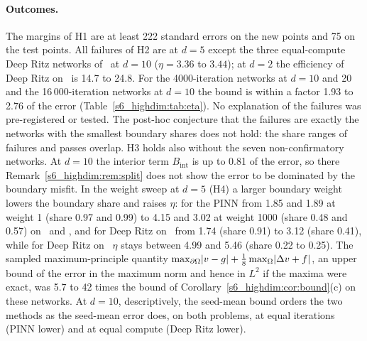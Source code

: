 \paragraph{Outcomes.} The margins of H1 are at least 222 standard errors on the new points and
75 on the test points. All failures of H2 are at $d=5$ except the three equal-compute Deep Ritz
networks of \Ptwo\ at $d=10$ ($\eta=3.36$ to $3.44$); at $d=2$ the efficiency of Deep Ritz on
\Ptwo\ is 14.7 to 24.8. For the 4000-iteration networks at $d=10$ and 20 and the
16\,000-iteration networks at $d=10$ the bound is within a factor 1.93 to 2.76 of the error
(Table~\ref{s6_highdim:tab:eta}).
No explanation of the failures was pre-registered or tested. The post-hoc conjecture that the
failures are exactly the networks with the smallest boundary shares does not hold: the share ranges
of failures and passes overlap.
H3 holds also without the seven non-confirmatory networks. At $d=10$ the interior term
$B_{\mathrm{int}}$ is up to 0.81 of the error, so there Remark~\ref{s6_highdim:rem:split} does
not show the error to be dominated by the boundary misfit.
In the weight sweep at $d=5$ (H4) a larger boundary weight lowers the boundary share and raises
$\eta$: for the PINN from 1.85 and 1.89 at weight 1 (share 0.97 and 0.99) to 4.15 and 3.02 at
weight 1000 (share 0.48 and 0.57) on \Ptwo\ and \Pone, and for Deep Ritz on \Pone\ from 1.74
(share 0.91) to 3.12 (share 0.41), while for Deep Ritz on \Ptwo\ $\eta$ stays between 4.99 and 5.46
(share 0.22 to 0.25). The sampled maximum-principle quantity
$\max_{\partial\Omega}\lvert v-g\rvert+\frac18\max_\Omega\lvert \Delta v+f\rvert$, an upper bound of the error in the maximum
norm and hence in $L^2$ if the maxima were exact, was 5.7 to 42 times the bound of
Corollary~\ref{s6_highdim:cor:bound}(c) on these networks.
At $d=10$, descriptively, the seed-mean bound orders the two methods as the seed-mean error does,
on both problems, at equal iterations (PINN lower) and at equal compute (Deep Ritz lower).

